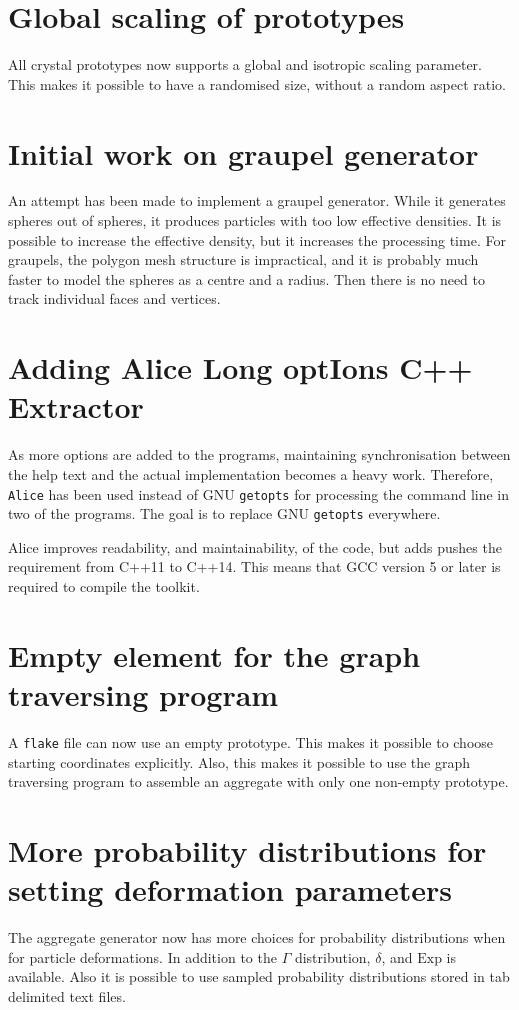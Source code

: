 \documentclass[a4paper,10pt]{scrartcl}
\newcommand{\prgname}[1]{\texttt{#1}}
\begin{document}
\section{Global scaling of prototypes}
All crystal prototypes now supports a global and isotropic scaling parameter. This makes it possible to have a randomised size, without a random aspect ratio.

\section{Initial work on graupel generator}
An attempt has been made to implement a graupel generator. While it generates spheres out of spheres, it produces particles with too low effective densities. It is possible to increase the effective density, but it increases the processing time. For graupels, the polygon mesh structure is impractical, and it is probably much faster to model the spheres as a centre and a radius. Then there is no need to track individual faces and vertices.

\section{Adding Alice Long optIons C++ Extractor}
As more options are added to the programs, maintaining synchronisation between the help text and the actual implementation becomes a heavy work. Therefore, \prgname{Alice}\cite{alice} has been used instead of GNU \prgname{getopts} for processing the command line in two of the programs. The goal is to replace GNU \prgname{getopts} everywhere.

Alice improves readability, and maintainability, of the code, but adds pushes the requirement from C++11 to C++14. This means that GCC version 5 or later\cite{GCC} is required to compile the toolkit.

\section{Empty element for the graph traversing program}
A \texttt{flake} file can now use an empty prototype. This makes it possible to choose starting coordinates explicitly. Also, this makes it possible to use the graph traversing program to assemble an aggregate with only one non-empty prototype.

\section{More probability distributions for setting deformation parameters}
The aggregate generator now has more choices for probability distributions when for particle deformations. In addition to the $\Gamma$ distribution, $\delta$, and $\text{Exp}$ is available. Also it is possible to use sampled probability distributions stored in tab delimited text files.
\end{document}
